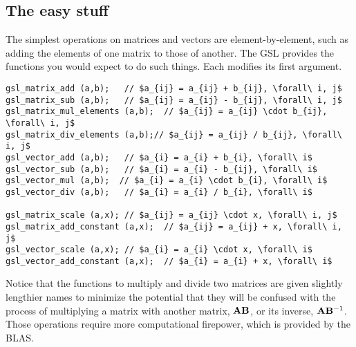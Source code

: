 \subsection{The easy stuff} The simplest operations on matrices and
vectors are element-by-element, such as adding the elements of one
matrix to those of another. The GSL provides the functions you would
expect to do such things. Each modifies its first argument.
 
 
 
 
 
 
\lstset{texcl=true} %
\begin{lstlisting}
gsl_matrix_add (a,b);   // $a_{ij} = a_{ij} + b_{ij}, \forall\ i, j$
gsl_matrix_sub (a,b);   // $a_{ij} = a_{ij} - b_{ij}, \forall\ i, j$
gsl_matrix_mul_elements (a,b);  // $a_{ij} = a_{ij} \cdot b_{ij}, \forall\ i, j$
gsl_matrix_div_elements (a,b);// $a_{ij} = a_{ij} / b_{ij}, \forall\ i, j$
gsl_vector_add (a,b);   // $a_{i} = a_{i} + b_{i}, \forall\ i$
gsl_vector_sub (a,b);   // $a_{i} = a_{i} - b_{ij}, \forall\ i$
gsl_vector_mul (a,b);  // $a_{i} = a_{i} \cdot b_{i}, \forall\ i$
gsl_vector_div (a,b);   // $a_{i} = a_{i} / b_{i}, \forall\ i$

gsl_matrix_scale (a,x); // $a_{ij} = a_{ij} \cdot x, \forall\ i, j$
gsl_matrix_add_constant (a,x);  // $a_{ij} = a_{ij} + x, \forall\ i, j$
gsl_vector_scale (a,x); // $a_{i} = a_{i} \cdot x, \forall\ i$
gsl_vector_add_constant (a,x);  // $a_{i} = a_{i} + x, \forall\ i$
\end{lstlisting}

Notice that the functions to multiply and divide two matrices are given
slightly lengthier names to minimize the potential that they will be
confused with the process of multiplying a matrix with another matrix,
${\bf A}{\bf B}$, or its inverse, 
${\bf A}{\bf B}^{-1}$. Those operations require more computational firepower, which
is provided by the BLAS.


